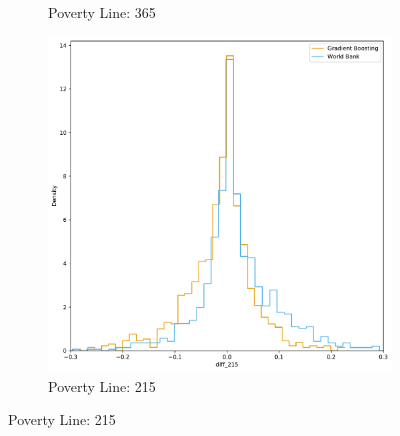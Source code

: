 \begin{figure}[H]
\begin{subfigure}[b]{0.47\textwidth}
             \caption{Poverty Line: 365}
         \end{subfigure} 
          \hfill
         \begin{subfigure}[b]{0.47\textwidth}
             \centering
             \includegraphics[width=\textwidth]{../figures/fig5c_prediction_vs_wb_diff_distribution_215.pdf}
             \caption{Poverty Line: 215}
         \end{subfigure} 
\end{figure}



